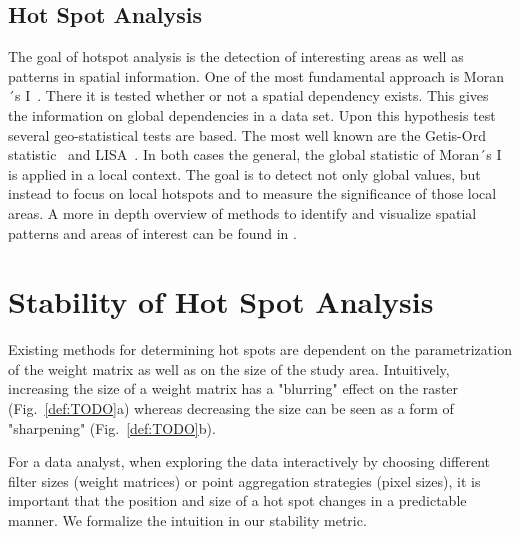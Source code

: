 \documentclass{itatnew}
\begin{document}
\subsection{Hot Spot Analysis}
The goal of hotspot analysis is the detection of interesting areas as well as patterns in spatial information. One of the most fundamental approach is Moran´s I~\cite{MoranI}. There it is tested whether or
not a spatial dependency exists. This gives the information on global
dependencies in a data set. Upon this hypothesis test several geo-statistical
tests are based. The most well known are the Getis-Ord statistic~\cite{Ord.1995}
and LISA~\cite{Anselin.1995}. In both cases the general, the global statistic of
Moran´s I is applied in a local context. The goal is to detect not only global
values, but instead to focus on local hotspots and to measure the significance
of those local areas. A more in depth overview of methods to identify and visualize spatial patterns and areas of interest can be found in \cite{shekhar2011identifying}. 

\section{Stability of Hot Spot Analysis}
\label{sec:Metric}

Existing methods for determining hot spots are dependent on the parametrization
of the weight matrix as well as on the size of the study area. Intuitively,
increasing the size of a weight matrix has a "blurring" effect on the raster
(Fig.~\ref{def:TODO}a) whereas decreasing the size can be seen as a form of
"sharpening" (Fig.~\ref{def:TODO}b).



For a data analyst, when exploring the data interactively by choosing different
filter sizes (weight matrices) or point aggregation strategies (pixel sizes), it
is important that the position and size of a hot spot changes in a predictable
manner. We formalize the intuition in our stability metric.

%
%
%  
\end{document}

